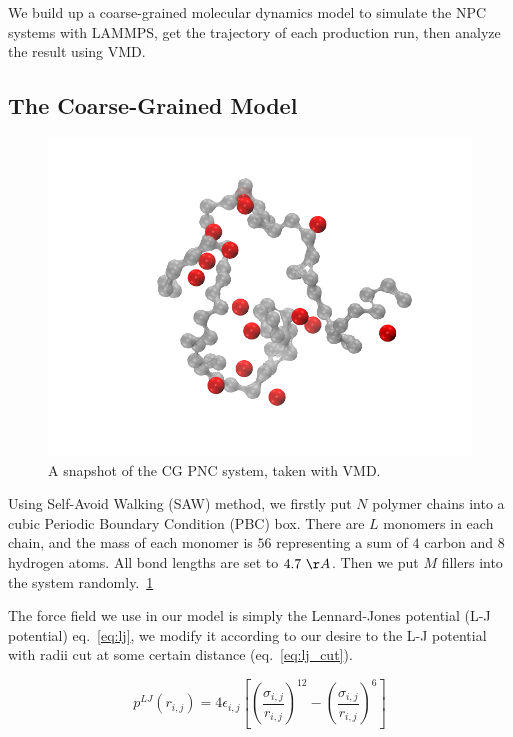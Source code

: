 

We build up a coarse-grained molecular dynamics model to simulate the NPC systems with LAMMPS, get the trajectory of each production run, then analyze the result using VMD.

\subsection*{The Coarse-Grained Model}
\begin{figure}[h!]
\begin{center}
\includegraphics[width=5in]{./figure/pnp.png}
\caption{A snapshot of the CG PNC system, taken with VMD.~\cite{Humphrey1996a}}
\label{fig:pnp_snapshot}
\end{center}
\end{figure}
Using Self-Avoid Walking (SAW) method, we firstly put $N$ polymer chains into a cubic Periodic Boundary Condition (PBC) box. There are $L$ monomers in each chain, and the mass of each monomer is $56$ representing a sum of $4$ carbon and $8$ hydrogen atoms. All bond lengths are set to $4.7~\AA$. Then we put $M$ fillers into the system randomly.~\ref{fig:pnp_snapshot}

The force field we use in our model is simply the Lennard-Jones potential (L-J potential) {eq.~\ref{eq:lj}}, we modify it according to our desire to the L-J potential with radii cut at some certain distance (eq.~\ref{eq:lj_cut}).

\begin{equation}\label{eq:lj}
p^{LJ}(r_{i,j})=4\epsilon_{i,j}\left[ \left(\frac{\sigma_{i,j}}{r_{i,j}}\right)^{12}-\left(\frac{\sigma_{i,j}}{r_{i,j}}\right)^6 \right]
\end{equation}

